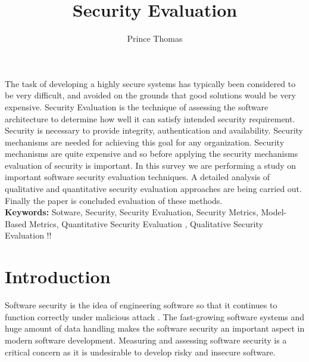 \documentclass[pdftex,english,oribibl]{llncs}
\title{Security Evaluation}
\author{Prince Thomas}
\institute{University of Stuttgart\\Institute of Software Technology (ISTE)\\70569 Stuttgart, Germany}
\makeatletter
\gdef\@keywords{}
\renewenvironment{abstract}{%
  \list{}{\advance\topsep by0.35cm\relax\small%
          \leftmargin=1cm%
          \labelwidth=\z@%
          \listparindent=\z@%
          \itemindent\listparindent%
          \rightmargin\leftmargin}%
          \item[\hskip\labelsep\bfseries\abstractname]}{%
  \if!\@keywords!\else{\item[~]\item[\hskip\labelsep\bfseries\keywordname]\@keywords}\fi%
  \endlist}
\makeatother
\begin{document}
\maketitle

\begin{abstract}

The task of developing a highly secure systems has typically been considered to be very difficult, and avoided on the grounds that good solutions would be very expensive. Security Evaluation is the technique of assessing the software architecture to determine how well it can satisfy intended security requirement. Security is necessary to provide integrity, authentication and availability. Security mechanisms are needed for achieving this goal for any organization. Security mechanisms are quite expensive and so before applying the security mechanisms evaluation of security is important. In this survey we are performing a study on important software security evaluation techniques. A detailed analysis of qualitative and quantitative security evaluation approaches are being carried out. Finally the paper is concluded evaluation of these methods.\\

\textbf{Keywords:} Sotware, Security, Security Evaluation, Security Metrics, Model-Based Metrics, Quantitative Security Evaluation , Qualitative Security Evaluation
\end{abstract}


\section{Introduction}

  Software security is the idea of engineering software so that it continues to function correctly under malicious attack \cite{1281254_McGraw}. The fast-growing software systems and huge amount of data handling makes the software security an important aspect in modern software development. Measuring and assessing software security is a critical concern as it is undesirable to develop risky and insecure software. 
  
\end{document}
